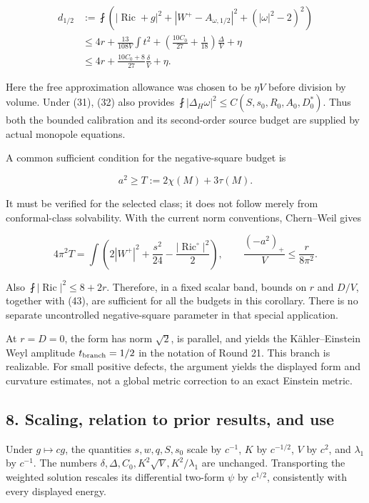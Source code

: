 \documentclass[
  11pt,
]{article}
\begin{document}
\[
\begin{aligned}
 d_{1/2}
 &:={\fint}\left(|\operatorname{Ric}+g|^2
       +|W^+-A_{\omega,1/2}|^2+(|\omega|^2-2)^2\right)\\
 &\le4r+\frac{13}{108V}\int t^2
       +\left(\frac{10C_0}{27}+\frac1{18}\right)\frac\Delta V
       +\eta\\
 &\le4r+\frac{10C_0+8}{27}\frac\delta V+\eta.
\end{aligned}
\tag{42}
\]

Here the free approximation allowance was chosen to be \(\eta V\) before
division by volume. Under (31), (32) also provides
\(\fint|\Delta_H\omega|^2\le C(S,s_0,R_0,A_0,D_0^*)\). Thus both the
bounded calibration and its second-order source budget are supplied by
actual monopole equations.

A common sufficient condition for the negative-square budget is

\[
 a^2\ge T:=2\chi(M)+3\tau(M).
 \tag{43}
\]

It must be verified for the selected class; it does not follow merely
from conformal-class solvability. With the current norm conventions,
Chern--Weil gives

\[
 4\pi^2T=\int\left(2|W^+|^2+\frac{s^2}{24}
                                  -\frac{|\operatorname{Ric}^{\circ}|^2}{2}\right),
 \qquad
 \frac{(-a^2)_+}{V}\le\frac r{8\pi^2}.
 \tag{44}
\]

Also \(\fint|\operatorname{Ric}|^2\le8+2r\). Therefore, in a fixed
scalar band, bounds on \(r\) and \(D/V\), together with (43), are
sufficient for all the budgets in this corollary. There is no separate
uncontrolled negative-square parameter in that special application.

At \(r=D=0\), the form has norm \(\sqrt2\), is parallel, and yields the
Kähler--Einstein Weyl amplitude \(t_{\rm branch}=1/2\) in the notation
of Round 21. This branch is realizable. For small positive defects, the
argument yields the displayed form and curvature estimates, not a global
metric correction to an exact Einstein metric.

\hypertarget{scaling-relation-to-prior-results-and-use}{%
\subsection{8. Scaling, relation to prior results, and
use}\label{scaling-relation-to-prior-results-and-use}}

Under \(g\mapsto cg\), the quantities \(s,w,q,S,s_0\) scale by
\(c^{-1}\), \(K\) by \(c^{-1/2}\), \(V\) by \(c^2\), and \(\lambda_1\)
by \(c^{-1}\). The numbers
\(\delta,\Delta,C_0,K^2\sqrt V,K^2/\lambda_1\) are unchanged.
Transporting the weighted solution rescales its differential two-form
\(\psi\) by \(c^{1/2}\), consistently with every displayed energy.
\end{document}
